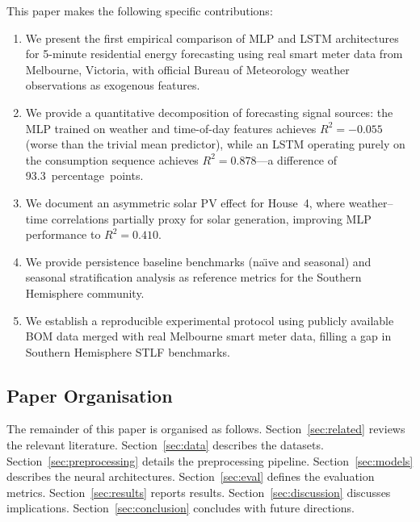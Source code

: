 \documentclass[12pt,a4paper]{article}
\begin{document}
This paper makes the following specific contributions:

\begin{enumerate}[leftmargin=2em]
  \item We present the first empirical comparison of MLP and LSTM
        architectures for 5-minute residential energy forecasting using
        real smart meter data from Melbourne, Victoria, with official
        Bureau of Meteorology weather observations as exogenous features.

  \item We provide a quantitative decomposition of forecasting signal
        sources: the MLP trained on weather and time-of-day features
        achieves $R^2 = -0.055$ (worse than the trivial mean predictor),
        while an LSTM operating purely on the consumption sequence achieves
        $R^2 = 0.878$---a difference of 93.3~percentage~points.

  \item We document an asymmetric solar PV effect for House~4, where
        weather--time correlations partially proxy for solar generation,
        improving MLP performance to $R^2 = 0.410$.

  \item We provide persistence baseline benchmarks (na\"{\i}ve and
        seasonal) and seasonal stratification analysis as reference metrics
        for the Southern Hemisphere community.

  \item We establish a reproducible experimental protocol using publicly
        available BOM data merged with real Melbourne smart meter data,
        filling a gap in Southern Hemisphere STLF benchmarks.
\end{enumerate}

\subsection{Paper Organisation}
The remainder of this paper is organised as follows. Section~\ref{sec:related}
reviews the relevant literature. Section~\ref{sec:data} describes the
datasets. Section~\ref{sec:preprocessing} details the preprocessing pipeline.
Section~\ref{sec:models} describes the neural architectures. Section~\ref{sec:eval}
defines the evaluation metrics. Section~\ref{sec:results} reports results.
Section~\ref{sec:discussion} discusses implications. Section~\ref{sec:conclusion}
concludes with future directions.

\end{document}
